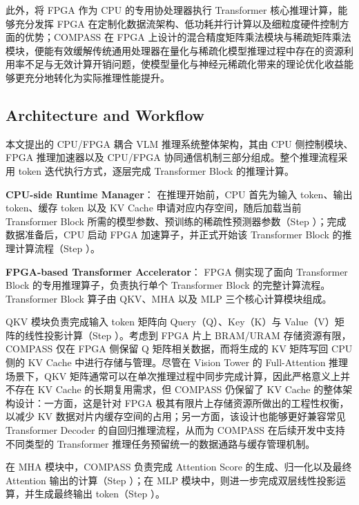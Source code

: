 \documentclass[sigconf]{acmart}
\begin{document}
	此外，将 FPGA 作为 CPU 的专用协处理器执行 Transformer 核心推理计算，能够充分发挥 FPGA 在定制化数据流架构、低功耗并行计算以及细粒度硬件控制方面的优势；COMPASS 在 FPGA 上设计的混合精度矩阵乘法模块与稀疏矩阵乘法模块，便能有效缓解传统通用处理器在量化与稀疏化模型推理过程中存在的资源利用率不足与无效计算开销问题，使模型量化与神经元稀疏化带来的理论优化收益能够更充分地转化为实际推理性能提升。

	\subsection{Architecture and Workflow}
	
	本文提出的 CPU/FPGA 耦合 VLM 推理系统整体架构，其由 CPU 侧控制模块、FPGA 推理加速器以及 CPU/FPGA 协同通信机制三部分组成。整个推理流程采用 token 迭代执行方式，逐层完成 Transformer Block 的推理计算。
	

	\textbf{CPU-side Runtime Manager}：
	在推理开始前，CPU 首先为输入 token、输出 token、缓存 token 以及 KV Cache 申请对应内存空间，随后加载当前 Transformer Block 所需的模型参数、预训练的稀疏性预测器参数（Step ）；完成数据准备后，CPU 启动 FPGA 加速算子，并正式开始该 Transformer Block 的推理计算流程（Step ）。

	\textbf{FPGA-based Transformer Accelerator}：
	FPGA 侧实现了面向 Transformer Block 的专用推理算子，负责执行单个 Transformer Block 的完整计算流程。Transformer Block 算子由 QKV、MHA 以及 MLP 三个核心计算模块组成。
	
	QKV 模块负责完成输入 token 矩阵向 Query（Q）、Key（K）与 Value（V）矩阵的线性投影计算（Step ）。考虑到 FPGA 片上 BRAM/URAM 存储资源有限，COMPASS 仅在 FPGA 侧保留 Q 矩阵相关数据，而将生成的 KV 矩阵写回 CPU 侧的 KV Cache 中进行存储与管理。尽管在 Vision Tower 的 Full-Attention 推理场景下，QKV 矩阵通常可以在单次推理过程中同步完成计算，因此严格意义上并不存在 KV Cache 的长期复用需求，但 COMPASS 仍保留了 KV Cache 的整体架构设计：一方面，这是针对 FPGA 极其有限片上存储资源所做出的工程性权衡，以减少 KV 数据对片内缓存空间的占用；另一方面，该设计也能够更好兼容常见 Transformer Decoder 的自回归推理流程，从而为 COMPASS 在后续开发中支持不同类型的 Transformer 推理任务预留统一的数据通路与缓存管理机制。
	
	在 MHA 模块中，COMPASS 负责完成 Attention Score 的生成、归一化以及最终 Attention 输出的计算（Step ）；在 MLP 模块中，则进一步完成双层线性投影运算，并生成最终输出 token（Step ）。
	
\end{document}
